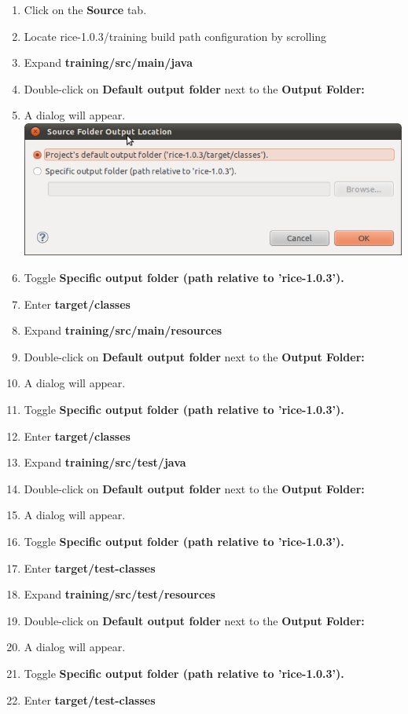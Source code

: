 \begin{enumerate}
  \item Click on the \textbf{Source} tab.
  \item Locate rice-1.0.3/training build path configuration by scrolling
  \item Expand \textbf{training/src/main/java}
  \item Double-click on \textbf{Default output folder} next to the
    \textbf{Output Folder:}
  \item A dialog will appear.\\
    \includegraphics[width=\textwidth]{images/Screenshot4.png}

  \item Toggle \textbf{Specific output folder (path relative to
      'rice-1.0.3').}
  \item Enter \textbf{target/classes}
  \item Expand \textbf{training/src/main/resources}
  \item Double-click on \textbf{Default output folder} next to the
    \textbf{Output Folder:}
  \item A dialog will appear.
  \item Toggle \textbf{Specific output folder (path relative to
      'rice-1.0.3').}
  \item Enter \textbf{target/classes}
  \item Expand \textbf{training/src/test/java}
  \item Double-click on \textbf{Default output folder} next to the
    \textbf{Output Folder:}
  \item A dialog will appear.
  \item Toggle \textbf{Specific output folder (path relative to
      'rice-1.0.3').}
  \item Enter \textbf{target/test-classes}
  \item Expand \textbf{training/src/test/resources}
  \item Double-click on \textbf{Default output folder} next to the
    \textbf{Output Folder:}
  \item A dialog will appear.
  \item Toggle \textbf{Specific output folder (path relative to
      'rice-1.0.3').}
  \item Enter \textbf{target/test-classes}
\end{enumerate}


